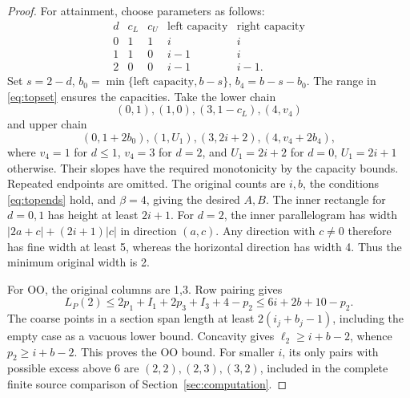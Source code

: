 \documentclass[11pt]{article}
\begin{document}
\begin{proof}
For attainment, choose parameters as follows:
\[
\begin{array}{c|cc|cc}
d&c_L&c_U&\text{left capacity}&\text{right capacity}\\ \hline
0&1&1&i&i\\
1&1&0&i-1&i\\
2&0&0&i-1&i-1 .
\end{array}
\]
Set \(s=2-d\), \(b_0=\min\{\text{left capacity},b-s\}\),
\(b_4=b-s-b_0\). The range in \eqref{eq:topset} ensures the capacities.
Take the lower chain
\[
 (0,1),(1,0),(3,1-c_L),(4,v_4)
\]
and upper chain
\[
 (0,1+2b_0),(1,U_1),(3,2i+2),(4,v_4+2b_4),
\]
where \(v_4=1\) for \(d\le1\), \(v_4=3\) for \(d=2\), and
\(U_1=2i+2\) for \(d=0\), \(U_1=2i+1\) otherwise.
Their slopes have the required monotonicity by the capacity bounds.
Repeated endpoints are omitted. The original counts are \(i,b\), the
conditions \eqref{eq:topends} hold, and \(\beta=4\), giving the desired
\(A,B\). The inner rectangle for \(d=0,1\) has height at least \(2i+1\).
For \(d=2\), the inner parallelogram has width
\(|2a+c|+(2i+1)|c|\) in direction \((a,c)\).
Any direction with \(c\ne0\) therefore has fine width at least 5, whereas
the horizontal direction has width 4. Thus the minimum original width is 2.

For OO, the original columns are 1,3. Row pairing gives
\[
 L_P(2)\le2p_1+I_1+2p_3+I_3+4-p_2
        \le6i+2b+10-p_2.
\]
The coarse points in a section span length at least
\(2(i_j+b_j-1)\), including the empty case as a vacuous lower bound.
Concavity gives \(\ell_2\ge i+b-2\), whence \(p_2\ge i+b-2\).
This proves the OO bound. For smaller \(i\), its only pairs with possible
excess above 6 are \((2,2),(2,3),(3,2)\), included in the complete finite
source comparison of Section~\ref{sec:computation}.
\end{proof}
\end{document}
